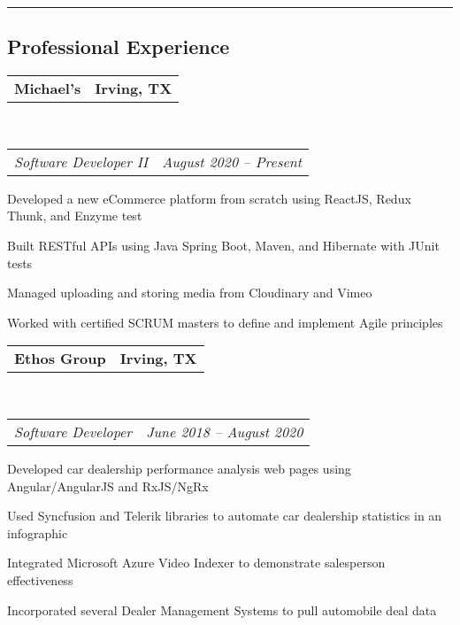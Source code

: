 \documentclass[10pt,letterpaper]{article}
\makeatletter
\newenvironment{indentsection}[1]%
{\begin{list}{}%
	{\setlength{\leftmargin}{#1}}%
	\item[]%
}
{\end{list}}
\newcommand{\headerrow}[2]
{\begin{tabular*}{\linewidth}{l@{\extracolsep{\fill}}r}
	#1 &
	#2 \\
\end{tabular*}}
\makeatother
\begin{document}
\hrule
\vspace{-0.8em}
\subsection*{Professional Experience}
\begin{indentsection}{\parindent}
	\vspace{-0.4em}
	\headerrow
		{\textbf{Michael's}}
		{\textbf{Irving, TX}}
	\\
	\headerrow
		{\emph{Software Developer II}}
		{\emph{August 2020 -- Present}}
	\begin{itemize*}
		\item Developed a new eCommerce platform from scratch using ReactJS, Redux Thunk, and Enzyme test
		\item Built RESTful APIs using Java Spring Boot, Maven, and Hibernate with JUnit tests
		\item Managed uploading and storing media from Cloudinary and Vimeo
		\item Worked with certified SCRUM masters to define and implement Agile principles 
	\end{itemize*}
\end{indentsection}
\begin{indentsection}{\parindent}
	\vspace{-0.4em}
	\headerrow
		{\textbf{Ethos Group}}
		{\textbf{Irving, TX}}
	\\
	\headerrow
		{\emph{Software Developer}}
		{\emph{June 2018 -- August 2020}}
	\begin{itemize*}
		\item Developed car dealership performance analysis web pages using Angular/AngularJS and RxJS/NgRx
		\item Used Syncfusion and Telerik libraries to automate car dealership statistics in an infographic
		\item Integrated Microsoft Azure Video Indexer to demonstrate salesperson effectiveness 
		\item Incorporated several Dealer Management Systems to pull automobile deal data
	\end{itemize*}
\end{indentsection}

\vspace{-1.8em}
\end{document}
